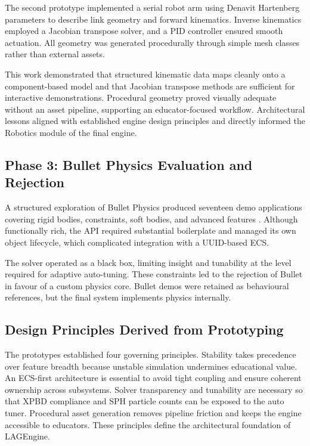 \documentclass[9pt,openany]{extbook}
\begin{document}
The second prototype implemented a serial robot arm using Denavit Hartenberg parameters \cite{denavit1955} to describe link geometry and forward kinematics. Inverse kinematics employed a Jacobian transpose solver, and a PID controller ensured smooth actuation. All geometry was generated procedurally through simple mesh classes rather than external assets.

This work demonstrated that structured kinematic data maps cleanly onto a component-based model and that Jacobian transpose methods are sufficient for interactive demonstrations. Procedural geometry proved visually adequate without an asset pipeline, supporting an educator-focused workflow. Architectural lessons aligned with established engine design principles \cite{gregory2018} and directly informed the Robotics module of the final engine.

\subsection{Phase 3: Bullet Physics Evaluation and Rejection}

A structured exploration of Bullet Physics produced seventeen demo applications covering rigid bodies, constraints, soft bodies, and advanced features \cite{coumans2015bullet}. Although functionally rich, the API required substantial boilerplate and managed its own object lifecycle, which complicated integration with a UUID-based ECS.

The solver operated as a black box, limiting insight and tunability at the level required for adaptive auto-tuning. These constraints led to the rejection of Bullet in favour of a custom physics core. Bullet demos were retained as behavioural references, but the final system implements physics internally.

\subsection{Design Principles Derived from Prototyping}

The prototypes established four governing principles. Stability takes precedence over feature breadth because unstable simulation undermines educational value. An ECS-first architecture is essential to avoid tight coupling and ensure coherent ownership across subsystems. Solver transparency and tunability are necessary so that XPBD compliance and SPH particle counts can be exposed to the auto tuner. Procedural asset generation removes pipeline friction and keeps the engine accessible to educators. These principles define the architectural foundation of LAGEngine.
\end{document}
